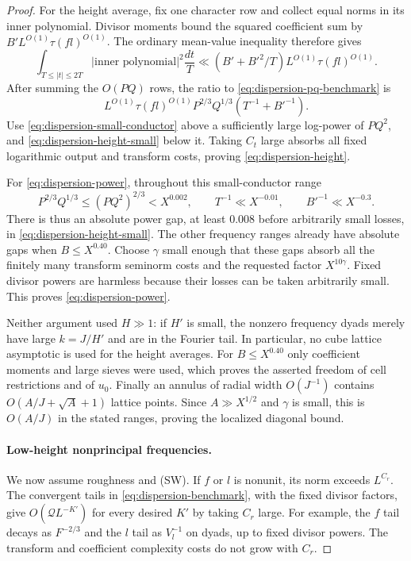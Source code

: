 \begin{proof}
For the height average, fix one character row and collect equal norms
in its inner polynomial. Divisor moments bound the squared coefficient
sum by $B'L^{O(1)}\tau(fl)^{O(1)}$. The ordinary mean-value inequality
therefore gives
\[
 \int_{T\le|t|\le2T}|\text{inner polynomial}|^2\frac{dt}{T}
 \ll (B'+B'^2/T)L^{O(1)}\tau(fl)^{O(1)}.
\]
After summing the $O(PQ)$ rows, the ratio to
\eqref{eq:dispersion-pq-benchmark} is
\begin{equation}
 L^{O(1)}\tau(fl)^{O(1)}P^{2/3}Q^{1/3}
       \left(T^{-1}+B'^{-1}\right).
 \label{eq:dispersion-height-small}
\end{equation}
Use \eqref{eq:dispersion-small-conductor} above a sufficiently large
log-power of $PQ^2$, and \eqref{eq:dispersion-height-small} below it.
Taking $C_t$ large absorbs all fixed logarithmic output and transform
costs, proving \eqref{eq:dispersion-height}.

For \eqref{eq:dispersion-power}, throughout this small-conductor range
\[
 P^{2/3}Q^{1/3}\le(PQ^2)^{2/3}<X^{0.002},\qquad
 T^{-1}\ll X^{-0.01},\qquad B'^{-1}\ll X^{-0.3}.
\]
There is thus an absolute power gap, at least $0.008$ before arbitrarily
small losses, in \eqref{eq:dispersion-height-small}. The other frequency
ranges already have absolute gaps when $B\le X^{0.40}$. Choose
$\gamma$ small enough that these gaps absorb all the finitely many
transform seminorm costs and the requested factor $X^{10\gamma}$.
Fixed divisor powers are harmless because their losses can be taken
arbitrarily small. This proves \eqref{eq:dispersion-power}.

Neither argument used $H\gg1$: if $H'$ is small, the nonzero frequency
dyads merely have large $k=J/H'$ and are in the Fourier tail. In
particular, no cube lattice asymptotic is used for the height averages.
For $B\le X^{0.40}$ only coefficient moments and large sieves were
used, which proves the asserted freedom of cell restrictions and of
$u_0$. Finally an annulus of radial width $O(J^{-1})$ contains
$O(A/J+\sqrt A+1)$ lattice points. Since $A\gg X^{1/2}$ and $\gamma$
is small, this is $O(A/J)$ in the stated ranges, proving the localized
diagonal bound.

\paragraph{Low-height nonprincipal frequencies.}
We now assume roughness and (SW). If $f$ or $l$ is nonunit, its norm
exceeds $L^{C_r}$. The convergent tails in
\eqref{eq:dispersion-benchmark}, with the fixed divisor factors, give
$O(\mathcal Q L^{-K'})$ for every desired $K'$ by taking $C_r$ large.
For example, the $f$ tail decays as $F^{-2/3}$ and the $l$ tail as
$V_l^{-1}$ on dyads, up to fixed divisor powers. The transform and
coefficient complexity costs do not grow with $C_r$.


\end{proof}
